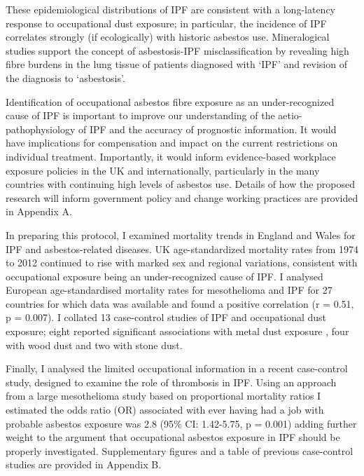 \documentclass[a4paper,10pt]{article}
\begin{document}
These epidemiological distributions of IPF are consistent with a long-latency response to occupational dust exposure; in particular, the incidence of IPF correlates strongly (if ecologically) with historic asbestos use.\cite{Barber2015} Mineralogical studies support the concept of asbestosis-IPF misclassification by revealing high fibre burdens in the lung tissue of patients diagnosed with `IPF' and revision of the diagnosis to `asbestosis'.\cite{Monso1990}\cite{Monso1991}\cite{Glazer2009}\cite{Ghio2014} 

Identification of occupational asbestos fibre exposure as an under-recognized cause of IPF is important to improve our understanding of the aetio-pathophysiology of IPF and the accuracy of prognostic information. It would have implications for compensation and impact on the current restrictions on individual treatment. Importantly, it would inform evidence-based workplace exposure policies in the UK and internationally, particularly in the many countries with continuing high levels of asbestos use. Details of how the proposed research will inform government policy and change working practices are provided in Appendix A.

In preparing this protocol, I examined mortality trends in England and Wales for IPF and asbestos-related diseases. UK age-standardized mortality rates from 1974 to 2012 continued to rise with marked sex and regional variations, consistent with occupational exposure being an under-recognized cause of IPF.\cite{Reynolds2014} I analysed European age-standardised mortality rates for mesothelioma and IPF for 27 countries for which data was available and found a positive correlation (r = 0.51, p = 0.007). I collated 13 case-control studies of IPF and occupational dust exposure; eight reported significant associations with metal dust exposure \cite{Scott1990}\cite{Iwai1994}\cite{Hubbard1996}\cite{Hubbard2000}\cite{Miyake2005}\cite{Pinheiro2008}, four with wood dust \cite{Hubbard1996a}\cite{Gustafson2007}\cite{Pinheiro2008}\cite{Awadalla2012} and two with stone dust.\cite{Baumgartner2000}\cite{Mullen1998}

Finally, I analysed the limited occupational information in a recent case-control study, designed to examine the role of thrombosis in IPF.\cite{Navaratnam2011} Using an approach from a large mesothelioma study based on proportional mortality ratios\cite{Rake2009} I estimated the odds ratio (OR) associated with ever having had a job with probable asbestos exposure was 2.8 (95\% CI: 1.42-5.75, p = 0.001) adding further weight to the argument that occupational asbestos exposure in IPF should be properly investigated. Supplementary figures and a table of previous case-control studies are provided in Appendix B. 
\end{document}
